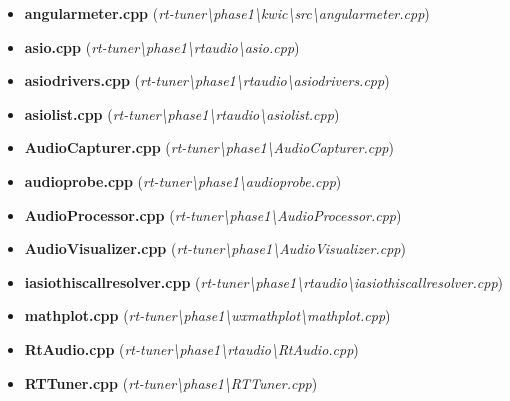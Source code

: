 \documentclass[12pt]{report}
\begin{document}
\begin{appendices}
\begin{itemize}
\begin{itemize}
			\item {\bf angularmeter.cpp} (\emph{rt-tuner\textbackslash phase1\textbackslash kwic\textbackslash src\textbackslash angularmeter.cpp})
			\item {\bf asio.cpp} (\emph{rt-tuner\textbackslash phase1\textbackslash rtaudio\textbackslash asio.cpp})
			\item {\bf asiodrivers.cpp} (\emph{rt-tuner\textbackslash phase1\textbackslash rtaudio\textbackslash asiodrivers.cpp})
			\item {\bf asiolist.cpp} (\emph{rt-tuner\textbackslash phase1\textbackslash rtaudio\textbackslash asiolist.cpp})
			\item {\bf AudioCapturer.cpp} (\emph{rt-tuner\textbackslash phase1\textbackslash AudioCapturer.cpp})
			\item {\bf audioprobe.cpp} (\emph{rt-tuner\textbackslash phase1\textbackslash audioprobe.cpp})
			\item {\bf AudioProcessor.cpp} (\emph{rt-tuner\textbackslash phase1\textbackslash AudioProcessor.cpp})
			\item {\bf AudioVisualizer.cpp} (\emph{rt-tuner\textbackslash phase1\textbackslash AudioVisualizer.cpp})
			\item {\bf iasiothiscallresolver.cpp} (\emph{rt-tuner\textbackslash phase1\textbackslash rtaudio\textbackslash iasiothiscallresolver.cpp})
			\item {\bf mathplot.cpp} (\emph{rt-tuner\textbackslash phase1\textbackslash wxmathplot\textbackslash mathplot.cpp})
			\item {\bf RtAudio.cpp} (\emph{rt-tuner\textbackslash phase1\textbackslash rtaudio\textbackslash RtAudio.cpp})
			\item {\bf RTTuner.cpp} (\emph{rt-tuner\textbackslash phase1\textbackslash RTTuner.cpp})
		\end{itemize}
	\end{itemize}
	\clearpage



\end{appendices}
\end{document}
